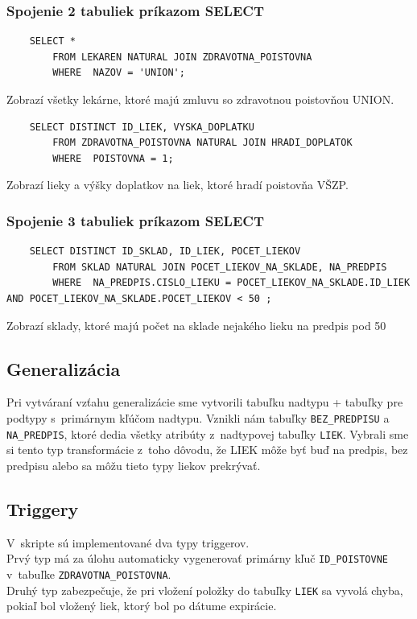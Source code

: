 \documentclass[a4paper, 11pt]{article}
\begin{document}
	\subsubsection{Spojenie 2 tabuliek príkazom SELECT}
	 \begin{lstlisting}
    SELECT *
        FROM LEKAREN NATURAL JOIN ZDRAVOTNA_POISTOVNA
        WHERE  NAZOV = 'UNION';
  	 \end{lstlisting}

	Zobrazí všetky lekárne, ktoré majú zmluvu so zdravotnou poistovňou UNION.

	 \begin{lstlisting}
    SELECT DISTINCT ID_LIEK, VYSKA_DOPLATKU
        FROM ZDRAVOTNA_POISTOVNA NATURAL JOIN HRADI_DOPLATOK
        WHERE  POISTOVNA = 1;
    	\end{lstlisting}
	\par Zobrazí lieky a výšky doplatkov na liek, ktoré hradí poistovňa VŠZP.\\

	\subsubsection{Spojenie 3 tabuliek príkazom SELECT}
	\begin{lstlisting}
    SELECT DISTINCT ID_SKLAD, ID_LIEK, POCET_LIEKOV
        FROM SKLAD NATURAL JOIN POCET_LIEKOV_NA_SKLADE, NA_PREDPIS
        WHERE  NA_PREDPIS.CISLO_LIEKU = POCET_LIEKOV_NA_SKLADE.ID_LIEK AND POCET_LIEKOV_NA_SKLADE.POCET_LIEKOV < 50 ;
    	\end{lstlisting}

	Zobrazí sklady, ktoré majú počet na sklade nejakého lieku na predpis pod 50\\


	\subsection{Generalizácia}
	Pri vytváraní vzťahu generalizácie sme vytvorili tabuľku nadtypu + tabuľky pre podtypy s~primárnym kľúčom nadtypu. Vznikli nám tabuľky \texttt{BEZ\_PREDPISU} a \texttt{NA\_PREDPIS}, ktoré dedia všetky atribúty z~nadtypovej tabuľky \texttt{LIEK}. Vybrali sme si tento typ transformácie z~toho dôvodu, že LIEK môže byť buď na predpis, bez predpisu alebo sa môžu tieto typy liekov prekrývať.
	\subsection{Triggery}
	V~skripte sú implementované dva typy triggerov. \\
	Prvý typ má za úlohu automaticky vygenerovať primárny kľuč \texttt{ID\_POISTOVNE} v~tabuľke \texttt{ZDRA\-VOT\-NA\_PO\-ISTOV\-NA}.\\
	Druhý typ zabezpečuje, že pri vložení položky do tabuľky \texttt{LIEK} sa vyvolá chyba, pokiaľ bol vložený liek, ktorý bol po dátume expirácie.
\end{document}
